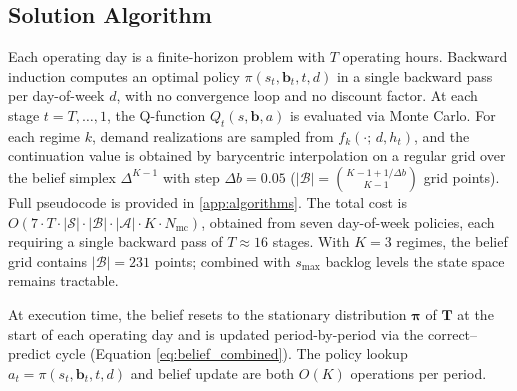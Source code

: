 \documentclass[preprint,11pt,authoryear]{elsarticle}
\newcommand{\bvec}[1]{\mathbf{#1}}
\theoremstyle{remark}
\begin{document}


\subsection{Solution Algorithm}
\label{sec:algorithm}

Each operating day is a finite-horizon problem with $T$ operating hours. Backward induction computes an optimal policy $\pi(s_t, \bvec{b}_t, t, d)$ in a single backward pass per day-of-week $d$, with no convergence loop and no discount factor. At each stage $t = T, \ldots, 1$, the Q-function $Q_t(s, \bvec{b}, a)$ is evaluated via Monte Carlo. For each regime $k$, demand realizations are sampled from $f_k(\cdot;\, d, h_t)$, and the continuation value is obtained by barycentric interpolation on a regular grid over the belief simplex $\Delta^{K-1}$ with step $\Delta b = 0.05$ ($|\mathcal{B}| = \binom{K-1+1/\Delta b}{K-1}$ grid points). Full pseudocode is provided in  \ref{app:algorithms}. The total cost is $O(7 \cdot T \cdot |\mathcal{S}| \cdot |\mathcal{B}| \cdot |\mathcal{A}| \cdot K \cdot N_{\text{mc}})$, obtained from seven day-of-week policies, each requiring a single backward pass of $T \approx 16$ stages. With $K = 3$ regimes, the belief grid contains $|\mathcal{B}| = 231$ points; combined with $s_{\max}$ backlog levels the state space remains tractable.

At execution time, the belief resets to the stationary distribution $\bvec{\pi}$ of $\bvec{T}$ at the start of each operating day and is updated period-by-period via the correct--predict cycle (Equation \ref{eq:belief_combined}). The policy lookup $a_t = \pi(s_t, \bvec{b}_t, t, d)$ and belief update are both $O(K)$ operations per period.
\end{document}
